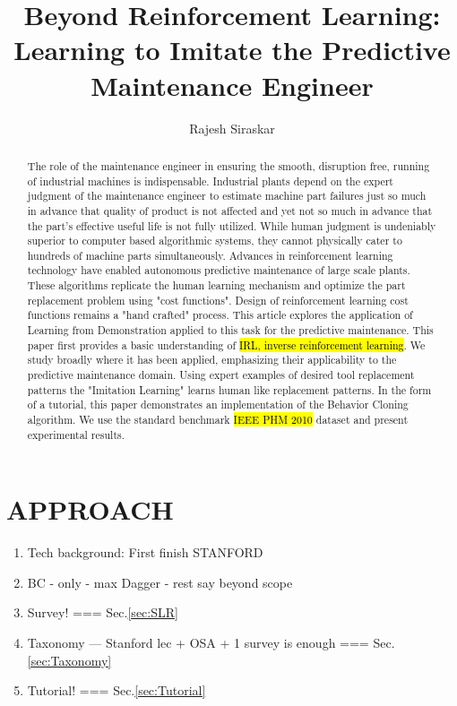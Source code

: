 \documentclass{article}
\title{Beyond Reinforcement Learning: Learning to Imitate the Predictive Maintenance Engineer}
\author{Rajesh Siraskar}
\newcommand{\hlc}[2][blue!10]{{\colorlet{foo}{#1} \sethlcolor{foo}\hl{#2}}}
\begin{document}
	\maketitle
	\begin{abstract}
		The role of the maintenance engineer in ensuring the smooth, disruption free, running of industrial machines is indispensable. Industrial plants depend on the expert judgment of the maintenance engineer to estimate machine part failures just so much in advance that quality of product is not affected and yet not so much in advance that the part's effective useful life is not fully utilized. While human judgment is undeniably superior to computer based algorithmic systems, they cannot physically cater to hundreds of machine parts simultaneously. Advances in reinforcement learning technology have enabled autonomous predictive maintenance of large scale plants. These algorithms replicate the human learning mechanism and optimize the part replacement problem using "cost functions". Design of reinforcement learning cost functions remains a "hand crafted" process. This article explores the application of Learning from Demonstration applied to this task for the predictive maintenance. This paper first provides a basic understanding of \hlc{IRL, inverse reinforcement learning}. We study broadly where it has been applied, emphasizing their applicability to the predictive maintenance domain. Using expert examples of desired tool replacement patterns the "Imitation Learning" learns human like replacement patterns. In the form of a tutorial, this paper demonstrates an implementation of the Behavior Cloning algorithm. We use the standard benchmark \hlc{IEEE PHM 2010} dataset and present experimental results.
	\end{abstract}
	
	\clearpage
	\section{APPROACH}
	\begin{enumerate}
		\item Tech background: First finish STANFORD
		\item \quad BC - only - max Dagger - rest say beyond scope
		\item Survey! === Sec.\ref{sec:SLR}
		\item \quad Taxonomy --- Stanford lec + OSA + 1 survey is enough === Sec.\ref{sec:Taxonomy}
		\item Tutorial! === Sec.\ref{sec:Tutorial}
	\end{enumerate}
\end{document}
